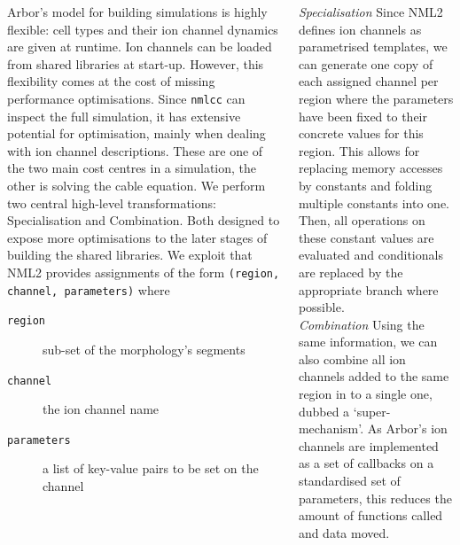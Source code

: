 \documentclass{beamer}
\begin{document}
\begin{frame}[t, fragile]
\begin{columns}[t]
\begin{column}{0.49\textwidth}
      Arbor's model for building simulations is highly flexible: cell types and
      their ion channel dynamics are given at runtime. Ion channels can be
      loaded from shared libraries at start-up. However, this flexibility comes
      at the cost of missing performance optimisations. Since \texttt{nmlcc} can
      inspect the full simulation, it has extensive potential for optimisation,
      mainly when dealing with ion channel descriptions. These are one of the
      two main cost centres in a simulation, the other is solving the cable
      equation. We perform two central high-level transformations:
      Specialisation and Combination. Both designed to expose more optimisations
      to the later stages of building the shared libraries. We exploit that NML2
      provides assignments of the form \verb!(region, channel, parameters)!
      where
      \begin{description}
        \item[\texttt{region}] sub-set of the morphology's segments
        \item[\texttt{channel}] the ion channel name
        \item[\texttt{parameters}] a list of key-value pairs to be set on the channel
      \end{description}
    \end{column}
    \begin{column}{0.49\textwidth}
      \emph{Specialisation} Since NML2 defines ion channels as parametrised
      templates, we can generate one copy of each assigned channel per region
      where the parameters have been fixed to their concrete values for this
      region. This allows for replacing memory accesses by constants and folding
      multiple constants into one. Then, all operations on these constant values
      are evaluated and conditionals are replaced by the appropriate branch
      where possible.\\[1.5ex]
      \emph{Combination} Using the same information, we can also combine all ion
      channels added to the same region in to a single one, dubbed a
      `super-mechanism'. As Arbor's ion channels are implemented as a set of
      callbacks on a standardised set
      of parameters, this reduces the amount of functions called and data moved.\\[1.5ex]


\end{column}
\end{columns}
\end{frame}
\end{document}
